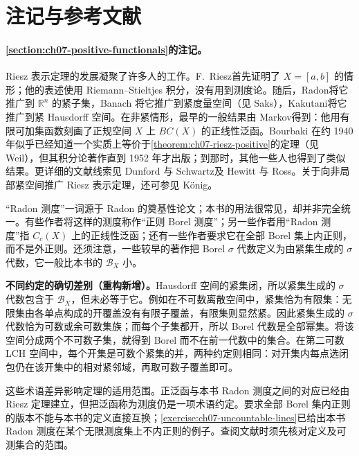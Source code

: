 \documentclass[../../main.tex]{subfiles}
\begin{document}
\section{注记与参考文献}\label{section:ch07-notes-references}\label{section:ch07-notes}
\paragraph*{\cref{section:ch07-positive-functionals}的注记。}
Riesz 表示定理的发展凝聚了许多人的工作。F.~Riesz\cite{folland-bib-116}首先证明了 $X=[a,b]$ 的情形；他的表述使用 Riemann--Stieltjes 积分，没有用到测度论。随后，Radon\cite{folland-bib-111}将它推广到 $\mathbb R^n$ 的紧子集，Banach 将它推广到紧度量空间（见 Saks\cite{folland-bib-128}），Kakutani\cite{folland-bib-080}将它推广到紧 Hausdorff 空间。在非紧情形，最早的一般结果由 Markov\cite{folland-bib-098}得到：他用有限可加集函数刻画了正规空间 $X$ 上 $BC(X)$ 的正线性泛函。Bourbaki 在约 1940 年似乎已经知道一个实质上等价于\cref{theorem:ch07-riesz-positive}的定理（见 Weil\cite[\S6]{folland-bib-158}），但其积分论著作直到 1952 年才出版；到那时，其他一些人也得到了类似结果。更详细的文献线索见 Dunford 与 Schwartz\cite[\S IV.16]{folland-bib-035}及 Hewitt 与 Ross\cite[\S11]{folland-bib-075}。关于向非局部紧空间推广 Riesz 表示定理，还可参见 König\cite{folland-bib-086}。

“Radon 测度”一词源于 Radon 的奠基性论文\cite{folland-bib-111}；本书的用法很常见，却并非完全统一。有些作者将这样的测度称作“正则 Borel 测度”；另一些作者用“Radon 测度”指 $C_c(X)$ 上的正线性泛函；还有一些作者要求它在全部 Borel 集上内正则，而不是外正则。还须注意，一些较早的著作把 Borel $\sigma$ 代数定义为由紧集生成的 $\sigma$ 代数，它一般比本书的 $\mathscr B_X$ 小。
\begin{remark}
\textbf{不同约定的确切差别（重构新增）。}Hausdorff 空间的紧集闭，所以紧集生成的 $\sigma$ 代数包含于 $\mathscr B_X$，但未必等于它。例如在不可数离散空间中，紧集恰为有限集：无限集由各单点构成的开覆盖没有有限子覆盖，有限集则显然紧。因此紧集生成的 $\sigma$ 代数恰为可数或余可数集族；而每个子集都开，所以 Borel 代数是全部幂集。将该空间分成两个不可数子集，就得到 Borel 而不在前一代数中的集合。在第二可数 LCH 空间中，每个开集是可数个紧集的并，两种约定则相同：对开集内每点选闭包仍在该开集中的相对紧邻域，再取可数子覆盖即可。

这些术语差异影响定理的适用范围。正泛函与本书 Radon 测度之间的对应已经由 Riesz 定理建立，但把泛函称为测度仍是一项术语约定。要求全部 Borel 集内正则的版本不能与本书的定义直接互换；\cref{exercise:ch07-uncountable-lines}已给出本书 Radon 测度在某个无限测度集上不内正则的例子。查阅文献时须先核对定义及可测集合的范围。
\end{remark}
\end{document}

